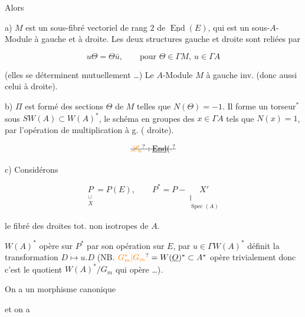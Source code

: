 
Alors

a) $M$ est un sous-fibré vectoriel de rang $2$ de $\underline{\operatorname{End}}(E)$, qui est un sous-$A$-Module à gauche et à droite. Les deux structures gauche et droite sont reliées par

\[
u\Theta=\Theta\bar u,\qquad\text{pour }\Theta\in\Gamma M,\ u\in\Gamma A
\]

(elles se déterminent  mutuellement \ldots) Le $A$-Module $M$ à gauche  inv. (donc aussi celui à droite).

b) $\Pi$ est formé des sections $\Theta$ de $M$ telles que $N(\Theta)=-1$. Il forme un torseur$^*$ sous $SW(A)\subset W(A)^*$, le  schéma en groupes des $x\in\Gamma A$ tels que $N(x)=1$, par l'opération de multiplication à g. (  droite).



\[
\deleted{\unsure{\mathscr L_u}:\underline{\operatorname{End}}(\unsure{.}}
\]

c) Considérons

\[
\underset{\substack{\cup\\X}}{P}=P(E),\qquad P^*=P-\underset{\substack{\Vert\\\operatorname{Spec}(A)}}{X'}
\]

le fibré des droites tot. non isotropes de $A$.

$W(A)^*$ opère sur $P^*$ par son opération sur $E$, par $u\in\Gamma W(A)^*$ définit la transformation $D\longmapsto u.D$ (NB. $\unsure{G_m^{*}|G_m}=W(\underline O)^*\subset A^*$ opère trivialement donc c'est le quotient $W(A)^*/G_m$ qui opère \ldots).

On a un  morphisme canonique



et on a

